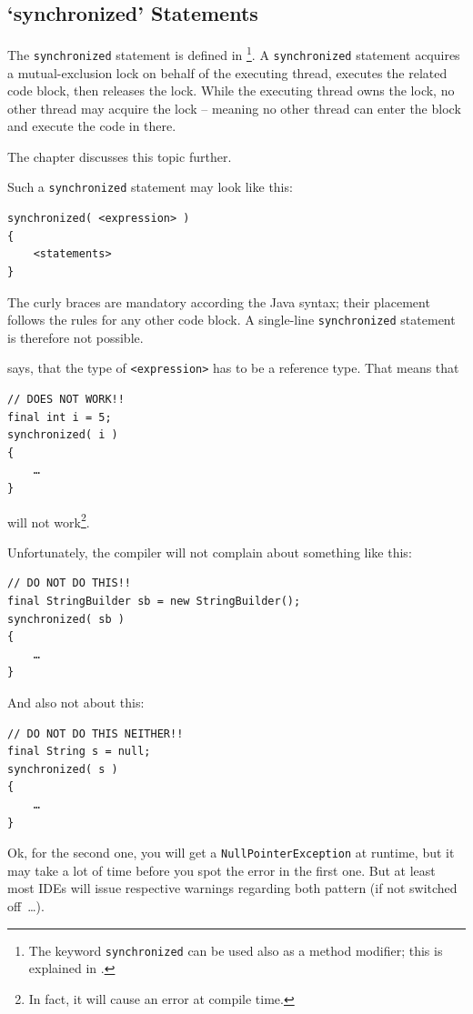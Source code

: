 \subsection{‘synchronized’ Statements}\label{sec:SynchronizedStatements}
The \lstinline|synchronized| statement is defined in \autocite{ORACLE_DOC_LANGUAGE_SPECIFICATION:Synchronized}\footnote{The keyword \lstinline|synchronized| can be used also as a method modifier; this is explained in \autocite{ORACLE_DOC_LANGUAGE_SPECIFICATION:SynchronizedMethods}.}. A \lstinline|synchronized| statement acquires a mutual-exclusion lock on behalf of the executing thread, executes the related code block, then releases the lock. While the executing thread owns the lock, no other thread may acquire the lock – meaning no other thread can enter the block and execute the code in there.

The chapter  discusses this topic further.

Such a \lstinline|synchronized| statement may look like this:
\begin{lstlisting}
synchronized( <expression> )
{
    <statements>
}
\end{lstlisting}
The curly braces are mandatory according the Java syntax; their placement follows the rules for any other code block. A single-line \lstinline|synchronized| statement is therefore not possible.

\jls \autocite{ORACLE_DOC_LANGUAGE_SPECIFICATION:Synchronized} says, that the type of \texttt{<expression>} has to be a reference type. That means that
\begin{lstlisting}
// DOES NOT WORK!!
final int i = 5;
synchronized( i )
{
    …
}
\end{lstlisting}
will not work\footnote{In fact, it will cause an error at compile time.}.

Unfortunately, the compiler will not complain about something like this:
\begin{lstlisting}
// DO NOT DO THIS!!
final StringBuilder sb = new StringBuilder();
synchronized( sb )
{
    …
}
\end{lstlisting}
And also not about this:
\begin{lstlisting}
// DO NOT DO THIS NEITHER!!
final String s = null;
synchronized( s )
{
    …
}
\end{lstlisting}
Ok, for the second one, you will get a \lstinline|NullPointerException| at runtime, but it may take a lot of time before you spot the error in the first one. But at least most IDEs will issue respective warnings regarding both pattern (if not switched off~…). 

